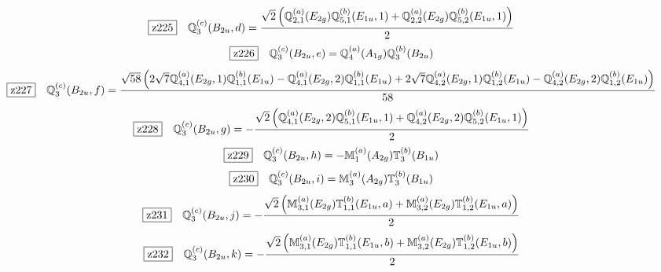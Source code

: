 \documentclass[fleqn,10pt,landscape]{jsarticle}
\begin{document}
\begin{dmath*}
\hspace*{3mm}\fbox{z225}\quad \mathbb{Q}_{3}^{(c)}(B_{2u},d)=\frac{\sqrt{2} \left(\mathbb{Q}_{2,1}^{(a)}(E_{2g}) \mathbb{Q}_{5,1}^{(b)}(E_{1u},1) + \mathbb{Q}_{2,2}^{(a)}(E_{2g}) \mathbb{Q}_{5,2}^{(b)}(E_{1u},1)\right)}{2}
\end{dmath*}
\begin{dmath*}
\hspace*{3mm}\fbox{z226}\quad \mathbb{Q}_{3}^{(c)}(B_{2u},e)=\mathbb{Q}_{4}^{(a)}(A_{1g}) \mathbb{Q}_{3}^{(b)}(B_{2u})
\end{dmath*}
\begin{dmath*}
\hspace*{3mm}\fbox{z227}\quad \mathbb{Q}_{3}^{(c)}(B_{2u},f)=\frac{\sqrt{58} \left(2 \sqrt{7} \mathbb{Q}_{4,1}^{(a)}(E_{2g},1) \mathbb{Q}_{1,1}^{(b)}(E_{1u}) - \mathbb{Q}_{4,1}^{(a)}(E_{2g},2) \mathbb{Q}_{1,1}^{(b)}(E_{1u}) + 2 \sqrt{7} \mathbb{Q}_{4,2}^{(a)}(E_{2g},1) \mathbb{Q}_{1,2}^{(b)}(E_{1u}) - \mathbb{Q}_{4,2}^{(a)}(E_{2g},2) \mathbb{Q}_{1,2}^{(b)}(E_{1u})\right)}{58}
\end{dmath*}
\begin{dmath*}
\hspace*{3mm}\fbox{z228}\quad \mathbb{Q}_{3}^{(c)}(B_{2u},g)=- \frac{\sqrt{2} \left(\mathbb{Q}_{4,1}^{(a)}(E_{2g},2) \mathbb{Q}_{5,1}^{(b)}(E_{1u},1) + \mathbb{Q}_{4,2}^{(a)}(E_{2g},2) \mathbb{Q}_{5,2}^{(b)}(E_{1u},1)\right)}{2}
\end{dmath*}
\begin{dmath*}
\hspace*{3mm}\fbox{z229}\quad \mathbb{Q}_{3}^{(c)}(B_{2u},h)=- \mathbb{M}_{1}^{(a)}(A_{2g}) \mathbb{T}_{3}^{(b)}(B_{1u})
\end{dmath*}
\begin{dmath*}
\hspace*{3mm}\fbox{z230}\quad \mathbb{Q}_{3}^{(c)}(B_{2u},i)=\mathbb{M}_{3}^{(a)}(A_{2g}) \mathbb{T}_{3}^{(b)}(B_{1u})
\end{dmath*}
\begin{dmath*}
\hspace*{3mm}\fbox{z231}\quad \mathbb{Q}_{3}^{(c)}(B_{2u},j)=- \frac{\sqrt{2} \left(\mathbb{M}_{3,1}^{(a)}(E_{2g}) \mathbb{T}_{1,1}^{(b)}(E_{1u},a) + \mathbb{M}_{3,2}^{(a)}(E_{2g}) \mathbb{T}_{1,2}^{(b)}(E_{1u},a)\right)}{2}
\end{dmath*}
\begin{dmath*}
\hspace*{3mm}\fbox{z232}\quad \mathbb{Q}_{3}^{(c)}(B_{2u},k)=- \frac{\sqrt{2} \left(\mathbb{M}_{3,1}^{(a)}(E_{2g}) \mathbb{T}_{1,1}^{(b)}(E_{1u},b) + \mathbb{M}_{3,2}^{(a)}(E_{2g}) \mathbb{T}_{1,2}^{(b)}(E_{1u},b)\right)}{2}
\end{dmath*}
\end{document}
